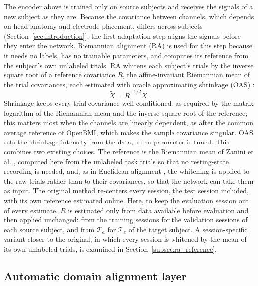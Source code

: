 \documentclass[preprint,12pt]{elsarticle}
\begin{document}
The encoder above is trained only on source subjects and receives the signals of a new subject as they are. Because the covariance between channels, which depends on head anatomy and electrode placement, differs across subjects (Section~\ref{sec:introduction}), the first adaptation step aligns the signals before they enter the network. Riemannian alignment (RA) is used for this step because it needs no labels, has no trainable parameters, and computes its reference from the subject's own unlabeled trials. RA whitens each subject's trials by the inverse square root of a reference covariance $\bar{R}$, the affine-invariant Riemannian mean of the trial covariances, each estimated with oracle approximating shrinkage (OAS) \cite{chen2010oas}:
\begin{equation}
    \widetilde{X}=\bar{R}^{-1/2}X.
\end{equation}
Shrinkage keeps every trial covariance well conditioned, as required by the matrix logarithm of the Riemannian mean and the inverse square root of the reference; this matters most when the channels are linearly dependent, as after the common average reference of OpenBMI, which makes the sample covariance singular. OAS sets the shrinkage intensity from the data, so no parameter is tuned. This combines two existing choices. The reference is the Riemannian mean of Zanini et al. \cite{zanini2018riemannian}, computed here from the unlabeled task trials so that no resting-state recording is needed, and, as in Euclidean alignment \cite{he2020euclidean}, the whitening is applied to the raw trials rather than to their covariances, so that the network can take them as input. The original method re-centers every session, the test session included, with its own reference estimated online. Here, to keep the evaluation session out of every estimate, $\bar{R}$ is estimated only from data available before evaluation and then applied unchanged: from the training sessions for the validation sessions of each source subject, and from $\mathcal{T}_a$ for $\mathcal{T}_e$ of the target subject. A session-specific variant closer to the original, in which every session is whitened by the mean of its own unlabeled trials, is examined in Section~\ref{subsec:ra_reference}.

\subsection{Automatic domain alignment layer}
\label{subsec:autodial}
\end{document}
